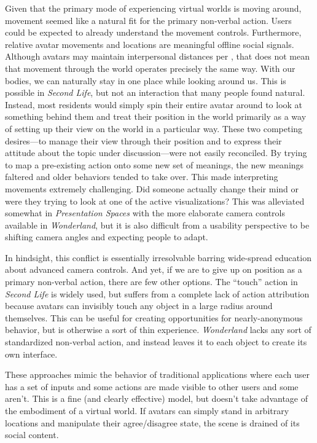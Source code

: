 Given that the primary mode of experiencing virtual worlds is moving around, movement seemed like a natural fit for the primary non-verbal action. Users could be expected to already understand the movement controls. Furthermore, relative avatar movements and locations are meaningful offline social signals.  Although avatars may maintain interpersonal distances per \citep{Yee:2007cl}, that does not mean that movement through the world operates precisely the same way. With our bodies, we can naturally stay in one place while looking around us. This is possible in \emph{Second Life}, but not an interaction that many people found natural. Instead, most residents would simply spin their entire avatar around to look at something behind them and treat their position in the world primarily as a way of setting up their view on the world in a particular way. These two competing desires---to manage their view through their position and to express their attitude about the topic under discussion---were not easily reconciled. By trying to map a pre-existing action onto some new set of meanings, the new meanings faltered and older behaviors tended to take over. This made interpreting movements extremely challenging. Did someone actually change their mind or were they trying to look at one of the active visualizations? This was alleviated somewhat in \emph{Presentation Spaces} with the more elaborate camera controls available in \emph{Wonderland}, but it is also difficult from a usability perspective to be shifting camera angles and expecting people to adapt.

In hindsight, this conflict is essentially irresolvable barring wide-spread education about advanced camera controls. And yet, if we are to give up on position as a primary non-verbal action, there are few other options. The ``touch'' action in \emph{Second Life} is widely used, but suffers from a complete lack of action attribution because avatars can invisibly touch any object in a large radius around themselves. This can be useful for creating opportunities for nearly-anonymous behavior, but is otherwise a sort of thin experience. \emph{Wonderland} lacks any sort of standardized non-verbal action, and instead leaves it to each object to create its own interface. 

These approaches mimic the behavior of traditional applications where each user has a set of inputs and some actions are made visible to other users and some aren't. This is a fine (and clearly effective) model, but doesn't take advantage of the embodiment of a virtual world. If avatars can simply stand in arbitrary locations and manipulate their agree/disagree state, the scene is drained of its social content.

